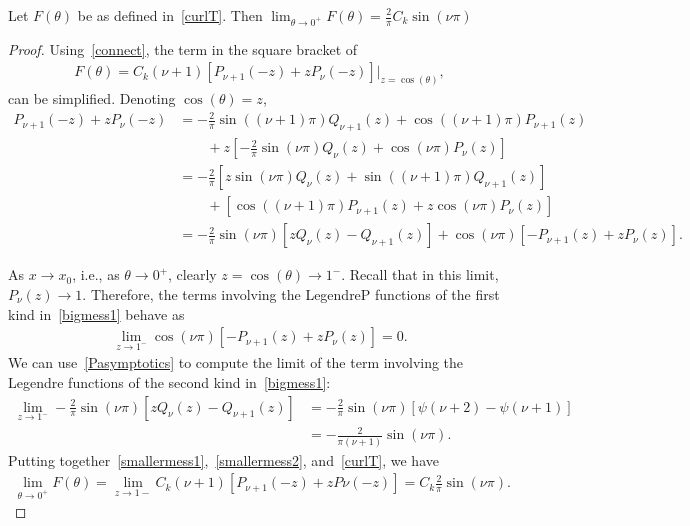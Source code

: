 \documentclass[final]{siamltex}
\newcommand{\C}{C_k}
\begin{document}
\begin{lemma} Let $F(\theta)$ be as defined in~\eqref{curlT}. Then
$\lim_{\theta\rightarrow 0^+} F(\theta)= \frac{2}{\pi}C_k \sin(\nu \pi)$
\end{lemma}
\begin{proof} 
Using~\eqref{connect}, the term in the square bracket of
\begin{align*}
F(\theta) =  \C (\nu+1)  \left[ P_{\nu+1}(-z) + 
  z P_\nu(-z)\right]\vert_{z=\cos(\theta)},
\end{align*}
can be simplified.  Denoting $\cos(\theta)=z$, 
\begin{align}
  P_{\nu+1}(-z) + z P_\nu(-z)&=-\frac{2}{\pi}\sin\left((\nu+1) \pi\right)Q_{\nu+1}(z)+
    \cos((\nu+1)\pi)P_{\nu+1}(z) \nonumber \\
  & \qquad +z\left[-\frac{2}{\pi}\sin(\nu\pi)Q_\nu\left(z\right)+
    \cos(\nu\pi)P_\nu\left(z\right)  \right] \nonumber \\
  &=-\frac{2}{\pi}\left[z\sin(\nu \pi)Q_\nu\left(z\right) + 
    \sin\left((\nu+1) \pi\right)Q_{\nu+1}\left(z\right)\right]
    \nonumber \\
  & \qquad +\left[ \cos((\nu+1)\pi)P_{\nu+1}\left(z\right) + 
    z\cos(\nu\pi)P_\nu\left(z\right) \right] \nonumber \\
  &=-\frac{2}{\pi}\sin(\nu \pi)\left[ 
    zQ_\nu\left(z\right) - Q_{\nu+1}\left(z\right)\right] 
  + \cos(\nu\pi)\left[
    -P_{\nu+1}\left(z\right)+zP_\nu\left(z\right)\right].
  \label{bigmess1}
\end{align}
 
As $x\rightarrow x_{0}$, i.e., as $\theta \rightarrow 0^{+}$, clearly
$z=\cos(\theta)\rightarrow 1^{-}$. Recall that in this limit, $P_\nu(z)
\rightarrow 1.$ Therefore, the terms involving the LegendreP functions
of the first kind in~\eqref{bigmess1} behave as 
\begin{align} 
  \label{smallermess1}
  \lim_{z \rightarrow 1^- }\cos(\nu\pi)\left[ -P_{\nu+1}(z)+ z P_\nu(z)
  \right]  = 0.
\end{align}
We can use~\eqref{Pasymptotics} to compute the limit of the term involving the Legendre functions of the second kind in~\eqref{bigmess1}:
\begin{align}
  \lim_{z \rightarrow 1^{-}} 
    -\frac{2}{\pi}\sin(\nu\pi)\left[zQ_\nu\left(z\right) - 
    Q_{\nu+1}\left(z\right)\right] 
  &= -\frac{2}{\pi}\sin(\nu\pi)\left[
    \psi(\nu+2)-\psi(\nu+1) \right] \\
  &= -\frac{2}{\pi (\nu+1)}\sin(\nu \pi).
  \label{smallermess2}
\end{align}
Putting together~\eqref{smallermess1},~\eqref{smallermess2},
and~\eqref{curlT}, we have
\begin{align} 
  \label{doublelayerwithz}
\lim_{\theta \rightarrow 0^+}F(\theta)=  \lim_{z\rightarrow 1-}\C(\nu+1)\left[ P_{\nu+1}(-z)+zP{\nu}(-z)\right] =
    \C \frac{2}{\pi} \sin(\nu \pi).
\end{align}

\end{proof}
\end{document}
